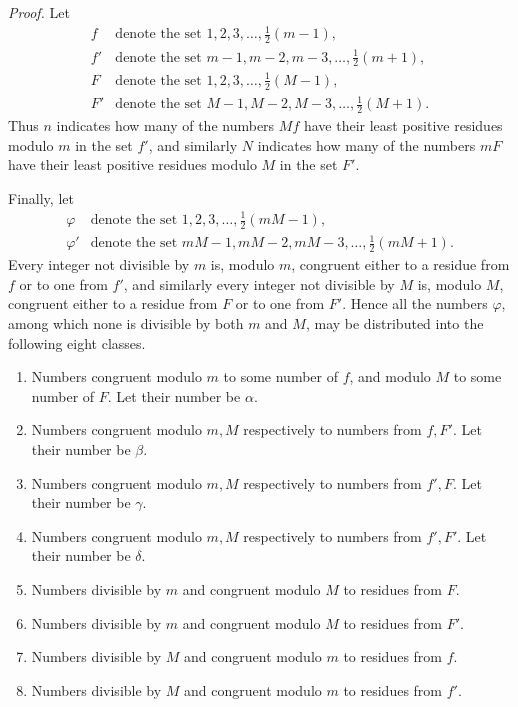 \documentclass[12pt]{article}
\begin{document}
\emph{Proof.} Let
\[
\begin{array}{ll}
f  & \text{denote the set }1,2,3,\ldots,\frac12(m-1),\\
f' & \text{denote the set }m-1,m-2,m-3,\ldots,\frac12(m+1),\\
F  & \text{denote the set }1,2,3,\ldots,\frac12(M-1),\\
F' & \text{denote the set }M-1,M-2,M-3,\ldots,\frac12(M+1).
\end{array}
\]
Thus $n$ indicates how many of the numbers $Mf$ have their least positive residues modulo $m$ in the set $f'$, and similarly $N$ indicates how many of the numbers $mF$ have their least positive residues modulo $M$ in the set $F'$.

Finally, let
\[
\begin{array}{ll}
\varphi  & \text{denote the set }1,2,3,\ldots,\frac12(mM-1),\\
\varphi' & \text{denote the set }mM-1,mM-2,mM-3,\ldots,\frac12(mM+1).
\end{array}
\]
Every integer not divisible by $m$ is, modulo $m$, congruent either to a residue from $f$ or to one from $f'$, and similarly every integer not divisible by $M$ is, modulo $M$, congruent either to a residue from $F$ or to one from $F'$. Hence all the numbers $\varphi$, among which none is divisible by both $m$ and $M$, may be distributed into the following eight classes.

\begin{enumerate}[label=\Roman*.]
\item Numbers congruent modulo $m$ to some number of $f$, and modulo $M$ to some number of $F$. Let their number be $\alpha$.
\item Numbers congruent modulo $m,M$ respectively to numbers from $f,F'$. Let their number be $\beta$.
\item Numbers congruent modulo $m,M$ respectively to numbers from $f',F$. Let their number be $\gamma$.
\item Numbers congruent modulo $m,M$ respectively to numbers from $f',F'$. Let their number be $\delta$.
\item Numbers divisible by $m$ and congruent modulo $M$ to residues from $F$.
\item Numbers divisible by $m$ and congruent modulo $M$ to residues from $F'$.
\item Numbers divisible by $M$ and congruent modulo $m$ to residues from $f$.
\item Numbers divisible by $M$ and congruent modulo $m$ to residues from $f'$.
\end{enumerate}
\end{document}
